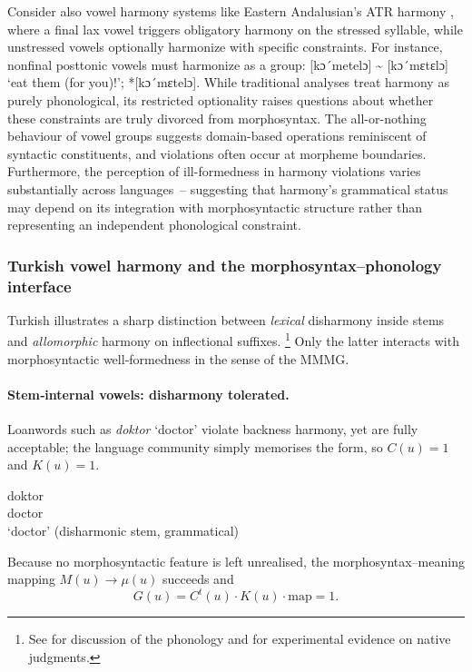 \documentclass[12pt,letterpaper]{article}
\begin{document}
Consider also vowel harmony systems like Eastern Andalusian's ATR harmony \autocite{Jiménez2007, Lloret2018, Lloret2009}, where a final lax vowel triggers obligatory harmony on the stressed syllable, while unstressed vowels optionally harmonize with specific constraints. For instance, nonfinal posttonic vowels must harmonize as a group: [kɔ´metelɔ] \textasciitilde{} [kɔ´mɛtɛlɔ] `eat them (for you)!'; *[kɔ´mɛtelɔ]. While traditional analyses treat harmony as purely phonological, its restricted optionality raises questions about whether these constraints are truly divorced from morphosyntax. The all-or-nothing behaviour of vowel groups suggests domain-based operations reminiscent of syntactic constituents, and violations often occur at morpheme boundaries. Furthermore, the perception of ill-formedness in harmony violations varies substantially across languages~-- suggesting that harmony's grammatical status may depend on its integration with morphosyntactic structure rather than representing an independent phonological constraint.

\subsubsection{Turkish vowel harmony and the morphosyntax--phonology interface}
\label{sec:turkish-harmony}

Turkish illustrates a sharp distinction between \emph{lexical} disharmony inside stems and
\emph{allomorphic} harmony on inflectional suffixes.%
\footnote{See \autocite{Sezer1981,KabakVogel2001} for discussion of the phonology and \autocite{Arik2015} for experimental evidence on native judgments.} 
Only the latter interacts with morphosyntactic well‑formedness in the sense of the MMMG.

\paragraph{Stem‑internal vowels: disharmony tolerated.}
Loanwords such as \textit{doktor} `doctor' violate backness harmony, yet are fully acceptable;
the language community simply memorises the form, so $C(u)=1$ and $K(u)=1$.

\ea \label{ex:doktor}
\gll doktor \\
     doctor\\
\glt `doctor' (disharmonic stem, grammatical)
\z

Because no morphosyntactic feature is left unrealised, the morphosyntax--meaning
mapping $\!M(u)\!\rightarrow\!\mu(u)$ succeeds and
\[
G(u)=C^t(u)\cdot K(u)\cdot\text{map}=1.
\]
\end{document}
